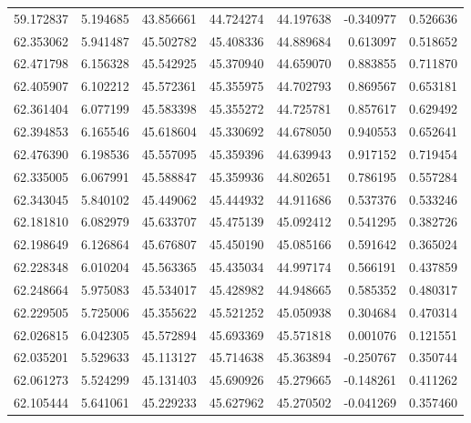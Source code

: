 \begin{tabular}{rrrrrrr}
 59.172837 &   5.194685 &         43.856661 &         44.724274 &         44.197638 & -0.340977 &  0.526636 \\
 62.353062 &   5.941487 &         45.502782 &         45.408336 &         44.889684 &  0.613097 &  0.518652 \\
 62.471798 &   6.156328 &         45.542925 &         45.370940 &         44.659070 &  0.883855 &  0.711870 \\
 62.405907 &   6.102212 &         45.572361 &         45.355975 &         44.702793 &  0.869567 &  0.653181 \\
 62.361404 &   6.077199 &         45.583398 &         45.355272 &         44.725781 &  0.857617 &  0.629492 \\
 62.394853 &   6.165546 &         45.618604 &         45.330692 &         44.678050 &  0.940553 &  0.652641 \\
 62.476390 &   6.198536 &         45.557095 &         45.359396 &         44.639943 &  0.917152 &  0.719454 \\
 62.335005 &   6.067991 &         45.588847 &         45.359936 &         44.802651 &  0.786195 &  0.557284 \\
 62.343045 &   5.840102 &         45.449062 &         45.444932 &         44.911686 &  0.537376 &  0.533246 \\
 62.181810 &   6.082979 &         45.633707 &         45.475139 &         45.092412 &  0.541295 &  0.382726 \\
 62.198649 &   6.126864 &         45.676807 &         45.450190 &         45.085166 &  0.591642 &  0.365024 \\
 62.228348 &   6.010204 &         45.563365 &         45.435034 &         44.997174 &  0.566191 &  0.437859 \\
 62.248664 &   5.975083 &         45.534017 &         45.428982 &         44.948665 &  0.585352 &  0.480317 \\
 62.229505 &   5.725006 &         45.355622 &         45.521252 &         45.050938 &  0.304684 &  0.470314 \\
 62.026815 &   6.042305 &         45.572894 &         45.693369 &         45.571818 &  0.001076 &  0.121551 \\
 62.035201 &   5.529633 &         45.113127 &         45.714638 &         45.363894 & -0.250767 &  0.350744 \\
 62.061273 &   5.524299 &         45.131403 &         45.690926 &         45.279665 & -0.148261 &  0.411262 \\
 62.105444 &   5.641061 &         45.229233 &         45.627962 &         45.270502 & -0.041269 &  0.357460 \\

\end{tabular}
